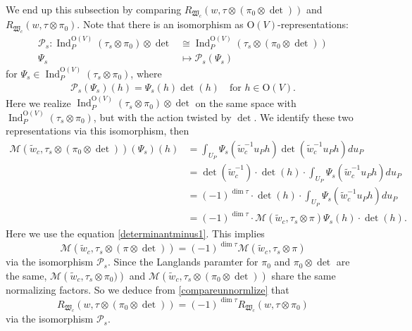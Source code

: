 \documentclass[article]{article}
\numberwithin{equation}{section}
\theoremstyle{definition}
\DeclareMathOperator{\Ind}{Ind}
\begin{document}
We end up this subsection by comparing 
$R_{\mathfrak W_{c}}(w,\tau\otimes(\pi_0\otimes\det))$ and $R_{\mathfrak W_{c}}(w,\tau\otimes\pi_0)$. Note that there is an isomorphism as $\mathrm O(V)$-representations: 
\begin{equation}
\begin{aligned}\label{59}
\mathcal P_s:\Ind_{P}^{\mathrm O(V)}(\tau_s\otimes \pi_0)\otimes
\det  &\cong  \Ind_{P}^{\mathrm O(V)}(\tau_s\otimes (\pi_0\otimes\det))\\
\Psi_s &\mapsto \mathcal P_s(\Psi_s)
\end{aligned}
\end{equation}
for $\Psi_s\in \Ind_{P}^{\mathrm O(V)}(\tau_s\otimes \pi_0)$, where 
\begin{align*}
\mathcal P_s(\Psi_s)(h)=\Psi_s(h)\det(h)\quad \mbox{for $h\in \mathrm O(V)$}. 
\end{align*}
Here we realize $\Ind_{P}^{\mathrm O(V)}(\tau_s\otimes \pi_0)\otimes
\det$ on the same space with $\Ind_{P}^{\mathrm O(V)}(\tau_s\otimes \pi_0)$, but with the action twisted by $\det$. We identify these two representations via this isomorphism, then 
\begin{align*}
\mathcal{M}\left(\widetilde{w}_c, \tau_{s} \otimes (\pi_0\otimes\det) \right) (\Psi_{s})\left(h\right) &=\int_{U_{P}} \Psi_{s}\left(\widetilde{w}_c^{-1} u_{P} h\right)\det\left(\widetilde{w}_c^{-1} u_{P} h\right) d u_{P}\\
&=\det(\widetilde{w}_c^{-1})\cdot \det(h)\cdot \int_{U_{P}} \Psi_{s}\left(\widetilde{w}_c^{-1} u_{P} h\right) d u_{P}\\
&=(-1)^{\dim \tau}\cdot \det(h)\cdot \int_{U_{P}} \Psi_{s}\left(\widetilde{w}_c^{-1} u_{P} h\right) d u_{P}\\
&=(-1)^{\dim \tau}\cdot  \mathcal{M}\left(\widetilde{w}_c, \tau_{s} \otimes \pi\right) \Psi_{s}(h)\cdot \det(h). 
\end{align*}
Here we use the equation \ref{determinantminus1}. This implies
\begin{equation}\label{compareunnormlize}
\mathcal{M}\left(\widetilde{w}_c, \tau_{s} \otimes (\pi\otimes\det) \right) =(-1)^{\dim \tau} \mathcal{M}\left(\widetilde{w}_c, \tau_{s} \otimes \pi \right) 
\end{equation}
via the isomorphism $\mathcal P_s$. Since the Langlands paramter for $\pi_0$ and $\pi_0\otimes\det$ are the same, $\mathcal{M}\left(\widetilde{w}_c, \tau_{s} \otimes \pi_0) \right) $ and $\mathcal{M}\left(\widetilde{w}_c, \tau_{s} \otimes (\pi_0\otimes\det) \right) $ share the same normalizing factors. So we deduce from \ref{compareunnormlize} that  
\begin{equation}\label{comparenormalize}
R_{\mathfrak W_c}(w,\tau\otimes(\pi_0\otimes\det))=(-1)^{\dim \tau}R_{\mathfrak W_c}(w,\tau\otimes\pi_0) 
\end{equation}
via the isomorphism $\mathcal P_s$. 
\end{document}
